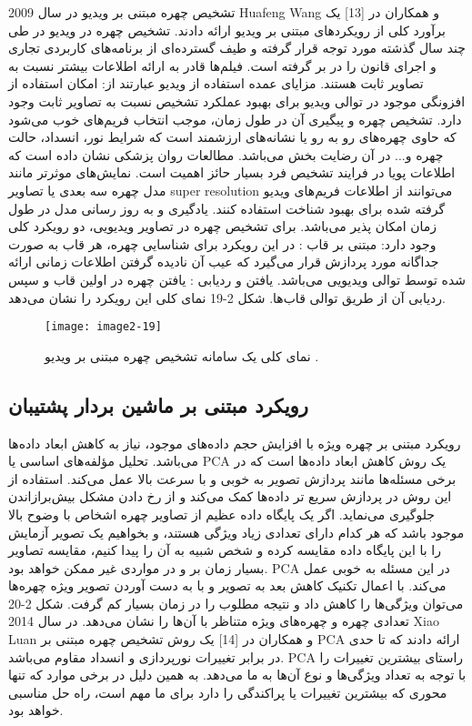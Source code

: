 	تشخیص چهره مبتنی بر ویدیو
در سال 2009 Huafeng Wang و همکاران در [13] یک برآورد کلی از رویکردهای مبتنی بر ویدیو ارائه دادند. تشخیص چهره در ویدیو در طی چند سال گذشته مورد توجه قرار گرفته و طیف گسترده‌ای از برنامه‌های کاربردی تجاری و اجرای قانون را در بر گرفته است. فیلم‌ها قادر به ارائه اطلاعات بیشتر نسبت به تصاویر ثابت هستند. مزایای عمده استفاده از ویدیو عبارتند از:
	امکان استفاده از افزونگی موجود در توالی ویدیو برای بهبود عملکرد تشخیص نسبت به تصاویر ثابت وجود دارد. تشخیص چهره و پیگیری آن در طول زمان، موجب انتخاب فریم‌های خوب می‌شود که حاوی چهره‌های رو به رو یا نشانه‌های ارزشمند است که شرایط نور، انسداد، حالت چهره و... در آن رضایت بخش می‌باشد.
	مطالعات روان پزشکی نشان داده است که اطلاعات پویا در فرایند تشخیص فرد بسیار حائز اهمیت است. 
	نمایش‌های موثرتر مانند مدل چهره سه بعدی یا تصاویر super resolution می‌توانند از اطلاعات فریم‌های ویدیو گرفته شده برای بهبود شناخت استفاده کنند.
	یادگیری و به روز رسانی مدل در طول زمان امکان پذیر می‌باشد.
برای تشخیص چهره در تصاویر ویدیویی، دو رویکرد کلی وجود دارد:
مبتنی بر قاب : در این رویکرد برای شناسایی چهره، هر قاب به صورت جداگانه مورد پردازش قرار می‌گیرد که عیب آن نادیده گرفتن اطلاعات زمانی ارائه شده توسط توالی ویدیویی می‌باشد. 
یافتن و ردیابی : یافتن چهره در اولین قاب و سپس ردیابی آن از طریق توالی قاب‌ها. شکل 2-19 نمای کلی این رویکرد را نشان می‌دهد.
 
 \begin{figure}[h]
\centering
  \texttt{[image: image2-19]}
  \caption{نمای کلی یک سامانه تشخیص چهره مبتنی بر ویدیو \cite{ref1}.}
  \label{image2-19}
\end{figure}

 \subsection{رویکرد مبتنی بر ماشین بردار پشتیبان}
	رویکرد مبتنی بر چهره ویژه 
با افزایش حجم داده‌های موجود، نیاز به کاهش ابعاد داده‌ها می‌باشد. تحلیل مؤلفه‌های اساسی یا PCA  یک روش‌ کاهش ابعاد داده‌ها است که در برخی مسئله‌ها مانند پردازش تصویر به خوبی و با سرعت بالا عمل می‌کند. استفاده از این روش در پردازش سریع تر داده‌ها کمک می‌کند و از رخ دادن مشکل بیش‌برازاندن  جلوگیری می‌نماید. اگر یک پایگاه داده عظیم از تصاویر چهره اشخاص با وضوح بالا موجود باشد که هر کدام دارای تعدادی زیاد ویژگی هستند، و بخواهیم یک تصویر آزمایش را با این پایگاه داده مقایسه کرده و شخص شبیه به آن را پیدا کنیم، مقایسه تصاویر بسیار زمان بر و در مواردی غیر ممکن خواهد بود. PCA در این مسئله به خوبی عمل می‌کند. با اعمال تکنیک کاهش بعد به تصویر و با به دست آوردن تصویر ویژه چهره‌ها می‌توان ویژگی‌ها را کاهش داد و نتیجه مطلوب را در زمان بسیار کم گرفت. شکل 2-20 تعدادی چهره و چهره‌های ویژه متناظر با آن‌ها را نشان می‌دهد.
در سال 2014 Xiao Luan و همکاران در [14] یک روش تشخیص چهره مبتنی بر PCA ارائه دادند که تا حدی در برابر تغییرات نورپردازی و انسداد مقاوم می‌باشد. PCA راستای بیشترین تغییرات را با توجه به تعداد ویژگی‌ها و نوع آن‌ها به ما می‌دهد. به همین دلیل در برخی موارد که تنها محوری که بیشترین تغییرات یا پراکندگی را دارد برای ما مهم است، راه حل مناسبی خواهد بود. 
 	 
